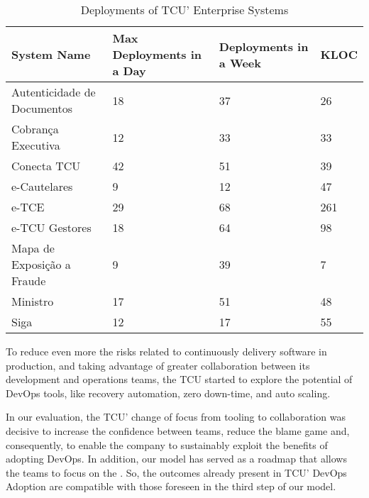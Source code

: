 \begin{table}[hb!]
\centering
\begin{tabular}{|p{5.5cm}|p{3.5cm}|p{2.7cm}|p{1.5cm}|} \hline
{\bf System Name} & {\bf Max Deployments in a Day} & {\bf Deployments in a Week} & {\bf KLOC}\\ \hline
Autenticidade de Documentos & 18 & 37 & 26 \\ \hline
Cobrança Executiva & 12 & 33 & 33 \\ \hline
Conecta TCU & 42 & 51 & 39  \\ \hline
e-Cautelares & 9 & 12 & 47  \\ \hline
e-TCE & 29 & 68 & 261 \\ \hline
e-TCU Gestores & 18 & 64 & 98 \\ \hline
Mapa de Exposi\c{c}\~{a}o a Fraude & 9 & 39 & 7 \\ \hline
Ministro & 17 & 51 & 48 \\ \hline
Siga & 12 & 17 & 55 \\ \hline

\end{tabular}
\caption{Deployments of TCU' Enterprise Systems}
\label{deployments_table}
\end{table}

To reduce even more the risks related to continuously delivery software in
production, and taking advantage of greater collaboration between its development
and operations teams, the TCU started to explore the potential of DevOps tools,
like recovery automation, zero down-time, and auto scaling.

In our evaluation, the TCU' change of focus from tooling to collaboration was
decisive to increase the confidence between teams, reduce the blame game and,
consequently, to enable the company to sustainably exploit the benefits of
adopting DevOps. In addition, our model has served as a roadmap that allows
the teams to focus on the \cc. So, the outcomes already present in TCU' DevOps
Adoption are compatible with those foreseen in the third step of our model.

